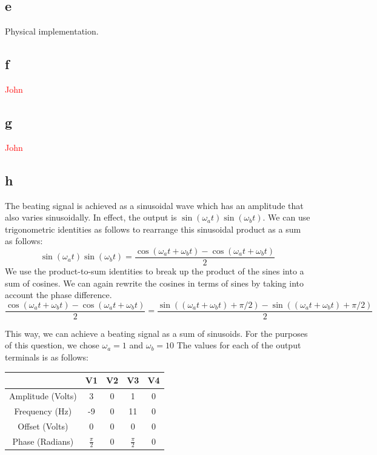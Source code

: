\documentclass{article}
\newcommand{\xxx}[1]{\textcolor{red}{#1}}
\theoremstyle{plain}
\theoremstyle{definition}
\theoremstyle{remark}
\begin{document}
\subsection*{e} Physical implementation.

\subsection*{f} \xxx{John}

\subsection*{g} \xxx{John}

\subsection*{h} 
The beating signal is achieved as a sinusoidal wave which has an amplitude that also varies sinusoidally. In effect, the output is $\sin(\omega_a t)\sin(\omega_b t) $. We can use trigonometric identities as follows to rearrange this sinusoidal product as a sum as follows:
$$\sin(\omega_a t)\sin(\omega_b t) = \frac{\cos(\omega_a t + \omega_b t) - \cos(\omega_a t + \omega_b t)}{2}$$
We use the product-to-sum identities to break up the product of the sines into a sum of cosines. We can again rewrite the cosines in terms of sines by taking into account the phase difference.
$$\frac{\cos(\omega_a t + \omega_b t) - \cos(\omega_a t + \omega_b t)}{2} = \frac{\sin((\omega_a t + \omega_b t) + \pi/2)- \sin((\omega_a t + \omega_b t) + \pi/2)}{2}$$

This way, we can achieve a beating signal as a sum of sinusoids. For the purposes of this question, we chose $\omega_a = 1$ and $\omega_b = 10$ The values for each of the output terminals is as follows:
\begin{table}[h]
\begin{center}
    \begin{tabular}{|c||c|c|c|c|}
        \hline
        ~                 & V1              & V2 & V3              & V4 \\ \hline \hline
        Amplitude (Volts) & 3               & 0  & 1               & 0  \\ \hline
        Frequency (Hz)    & -9              & 0  & 11              & 0  \\ \hline
        Offset (Volts)    & 0               & 0  & 0               & 0  \\ \hline
        Phase (Radians)            & $\frac{\pi}{2}$ & 0  & $\frac{\pi}{2}$ & 0  \\
        \hline
    \end{tabular}
\end{center}
\end{table}
\end{document}

